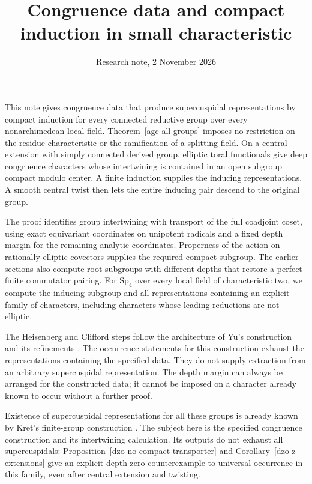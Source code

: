 \documentclass[10pt]{amsart}
\title{Congruence data and compact induction in small characteristic}
\author{}
\date{Research note, 2 November 2026}
\begin{document}
\maketitle

This note gives congruence data that produce supercuspidal representations by compact
induction for every connected reductive group over every nonarchimedean local field.
Theorem~\ref{agc-all-groups} imposes no restriction on the residue characteristic or
the ramification of a splitting field. On a central extension with simply connected
derived group, elliptic toral functionals give deep congruence characters whose
intertwining is contained in an open subgroup compact modulo center. A finite
induction supplies the inducing representations. A smooth central twist then lets
the entire inducing pair descend to the original group.

The proof identifies group intertwining with transport of the full coadjoint coset,
using exact equivariant coordinates on unipotent radicals and a fixed depth margin
for the remaining analytic coordinates. Properness of the action on rationally
elliptic covectors supplies the required compact subgroup. The earlier sections
also compute root subgroups with different depths that restore a perfect finite
commutator pairing. For $\mathrm{Sp}_4$ over every local field of characteristic two,
we compute the inducing subgroup and all representations containing an explicit
family of characters, including characters whose leading reductions are not elliptic.

The Heisenberg and Clifford steps follow the architecture of Yu's construction and
its refinements \cite{Yu,FintzenSchwein,Takaya}. The occurrence statements for this
construction exhaust the representations containing the specified data. They do not supply
extraction from an arbitrary supercuspidal representation. The depth margin can
always be arranged for the constructed data; it cannot be imposed on a character
already known to occur without a further proof.

Existence of supercuspidal representations for all these groups is already known
by Kret's finite-group construction \cite{Kret}. The subject here is the specified
congruence construction and its intertwining calculation. Its outputs do not
exhaust all supercuspidals: Proposition~\ref{dzo-no-compact-transporter} and
Corollary~\ref{dzo-z-extensions} give an explicit depth-zero counterexample to
universal occurrence in this family, even after central extension and twisting.
\end{document}
